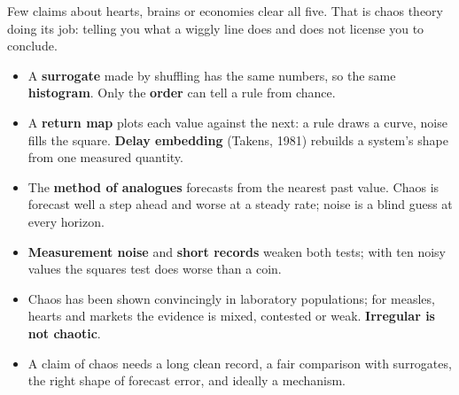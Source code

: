 \noindent
Few claims about hearts, brains or economies clear all five. That is chaos
theory doing its job: telling you what a wiggly line does and does not
license you to conclude.


\begin{summarybox}
\begin{itemize}
\item A \textbf{surrogate} made by shuffling has the same numbers, so the
  same \textbf{histogram}. Only the \textbf{order} can tell a rule from
  chance.
\item A \textbf{return map} plots each value against the next: a rule draws a
  curve, noise fills the square. \textbf{Delay embedding} (Takens, 1981)
  rebuilds a system's shape from one measured quantity.
\item The \textbf{method of analogues} forecasts from the nearest past value.
  Chaos is forecast well a step ahead and worse at a steady rate; noise is a
  blind guess at every horizon.
\item \textbf{Measurement noise} and \textbf{short records} weaken both tests;
  with ten noisy values the squares test does worse than a coin.
\item Chaos has been shown convincingly in laboratory populations; for
  measles, hearts and markets the evidence is mixed, contested or weak.
  \textbf{Irregular is not chaotic}.
\item A claim of chaos needs a long clean record, a fair comparison with
  surrogates, the right shape of forecast error, and ideally a mechanism.
\end{itemize}
\end{summarybox}

\canyou


